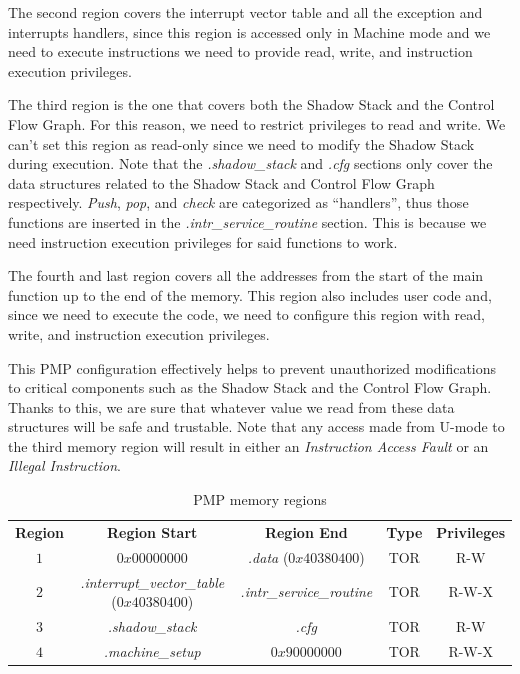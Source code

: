 The second region covers the interrupt vector table and all the exception and interrupts
handlers, since this region is accessed only in Machine mode and we need to
execute instructions we need to provide read, write, and instruction execution
privileges.

The third region is the one that covers both the Shadow Stack and the Control
Flow Graph. For this reason, we need to restrict privileges to read and write. We
can't set this region as read-only since we need to modify the Shadow Stack during
execution. Note that the \textit{.shadow\_stack} and \textit{.cfg} sections only
cover the data structures related to the Shadow Stack and Control Flow Graph
respectively. \textit{Push}, \textit{pop}, and \textit{check} are categorized as
``handlers'', thus those functions are inserted in the \textit{.intr\_service\_routine}
section. This is because we need instruction execution privileges for said functions
to work.

The fourth and last region covers all the addresses from the start of the main function
up to the end of the memory. This region also includes user code and, since we need
to execute the code, we need to configure this region with read, write, and
instruction execution privileges.

This PMP configuration effectively helps to prevent unauthorized modifications
to critical components such as the Shadow Stack and the Control Flow Graph. Thanks
to this, we are sure that whatever value we read from these data structures will
be safe and trustable. Note that any access made from U-mode to the third memory
region will result in either an \textit{Instruction Access Fault} or an \textit{Illegal
Instruction}.

\begin{table}
  \centering
  \begin{tabular}{|c|c|c|c|c|}
    \hline
    \textbf{Region}    & \textbf{Region Start}                             & \textbf{Region End}              & \textbf{Type} & \textbf{Privileges} \\
    \hhline{=====} $1$ & $0x00000000$                                      & \textit{.data} ($0x40380400$)    & TOR           & R-W                 \\
    \hline
    $2$                & \textit{.interrupt\_vector\_table} ($0x40380400$) & \textit{.intr\_service\_routine} & TOR           & R-W-X               \\
    \hline
    $3$                & \textit{.shadow\_stack}                           & \textit{.cfg}                    & TOR           & R-W                 \\
    \hline
    $4$                & \textit{.machine\_setup}                          & $0x90000000$                     & TOR           & R-W-X               \\
    \hline
  \end{tabular}
  \caption{PMP memory regions}
  \label{tab:pmpregions}
\end{table}

